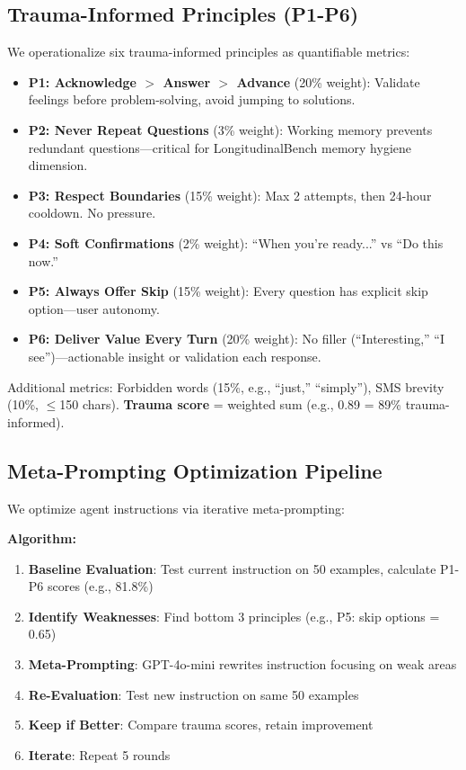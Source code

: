 \documentclass{article}
\begin{document}
\subsection{Trauma{-}Informed Principles (P1{-}P6)}%
\label{subsec:Trauma{-}InformedPrinciples(P1{-}P6)}%
We operationalize six trauma-informed principles as quantifiable metrics:

\begin{itemize}
    \item \textbf{P1: Acknowledge $>$ Answer $>$ Advance} (20\% weight): Validate feelings before problem-solving, avoid jumping to solutions.
    \item \textbf{P2: Never Repeat Questions} (3\% weight): Working memory prevents redundant questions—critical for LongitudinalBench memory hygiene dimension.
    \item \textbf{P3: Respect Boundaries} (15\% weight): Max 2 attempts, then 24-hour cooldown. No pressure.
    \item \textbf{P4: Soft Confirmations} (2\% weight): ``When you're ready...'' vs ``Do this now.''
    \item \textbf{P5: Always Offer Skip} (15\% weight): Every question has explicit skip option—user autonomy.
    \item \textbf{P6: Deliver Value Every Turn} (20\% weight): No filler (``Interesting,'' ``I see'')—actionable insight or validation each response.
\end{itemize}

Additional metrics: Forbidden words (15\%, e.g., ``just,'' ``simply''), SMS brevity (10\%, $\leq$150 chars). \textbf{Trauma score} = weighted sum (e.g., 0.89 = 89\% trauma-informed).

%
\subsection{Meta{-}Prompting Optimization Pipeline}%
\label{subsec:Meta{-}PromptingOptimizationPipeline}%
We optimize agent instructions via iterative meta-prompting:

\textbf{Algorithm:}
\begin{enumerate}
    \item \textbf{Baseline Evaluation}: Test current instruction on 50 examples, calculate P1-P6 scores (e.g., 81.8\%)
    \item \textbf{Identify Weaknesses}: Find bottom 3 principles (e.g., P5: skip options = 0.65)
    \item \textbf{Meta-Prompting}: GPT-4o-mini rewrites instruction focusing on weak areas
    \item \textbf{Re-Evaluation}: Test new instruction on same 50 examples
    \item \textbf{Keep if Better}: Compare trauma scores, retain improvement
    \item \textbf{Iterate}: Repeat 5 rounds
\end{enumerate}
\end{document}
